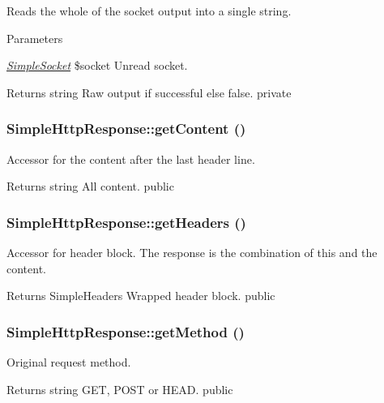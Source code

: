Reads the whole of the socket output into a single string. 
\begin{DoxyParams}{Parameters}
\item[{\em \hyperlink{class_simple_socket}{SimpleSocket}}]\$socket Unread socket. \end{DoxyParams}
\begin{DoxyReturn}{Returns}
string Raw output if successful else false.  private 
\end{DoxyReturn}
\hypertarget{class_simple_http_response_a51520abd6975a68164b5575ce09d7e97}{
\subsubsection[{getContent}]{\setlength{\rightskip}{0pt plus 5cm}SimpleHttpResponse::getContent ()}}
\label{class_simple_http_response_a51520abd6975a68164b5575ce09d7e97}
Accessor for the content after the last header line. \begin{DoxyReturn}{Returns}
string All content.  public 
\end{DoxyReturn}
\hypertarget{class_simple_http_response_a64145c3fecb25cea2c6df4dd0b620ef0}{
\subsubsection[{getHeaders}]{\setlength{\rightskip}{0pt plus 5cm}SimpleHttpResponse::getHeaders ()}}
\label{class_simple_http_response_a64145c3fecb25cea2c6df4dd0b620ef0}
Accessor for header block. The response is the combination of this and the content. \begin{DoxyReturn}{Returns}
SimpleHeaders Wrapped header block.  public 
\end{DoxyReturn}
\hypertarget{class_simple_http_response_ac3d79c4f31fae4ea243e1d08e6609ad8}{
\subsubsection[{getMethod}]{\setlength{\rightskip}{0pt plus 5cm}SimpleHttpResponse::getMethod ()}}
\label{class_simple_http_response_ac3d79c4f31fae4ea243e1d08e6609ad8}
Original request method. \begin{DoxyReturn}{Returns}
string GET, POST or HEAD.  public 
\end{DoxyReturn}
